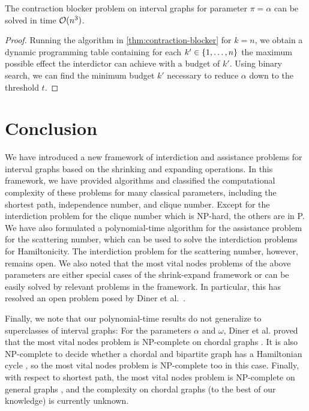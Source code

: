 \begin{corollary}
The contraction blocker problem on interval graphs for parameter $\pi = \alpha$ can be solved in time $\mathcal{O}(n^3)$.
\end{corollary}
\begin{proof}
Running the algorithm in \cref{thm:contraction-blocker} for $k = n$, we obtain a dynamic programming table containing for each $k' \in \{ 1, \ldots, n \}$ the maximum possible effect the interdictor can achieve with a budget of $k'$. Using binary search, we can find the minimum budget $k'$ necessary to reduce $\alpha$ down to the threshold $t$.
\end{proof}

\section{Conclusion}
We have introduced a new framework of interdiction and assistance problems for interval graphs based on the shrinking and expanding operations.
In this framework, we have provided algorithms and classified the computational complexity of these problems for many classical parameters, including the shortest path, independence number, and clique number.
Except for the interdiction problem for the clique number which is NP-hard, the others are in P.
We have also formulated a polynomial-time algorithm for the assistance problem for the scattering number, which can be used to solve the interdiction problems for Hamiltonicity.
The interdiction problem for the scattering number, however, remains open.
We also noted that the most vital nodes problems of the above parameters are either special cases of the shrink-expand framework or can be easily solved by relevant problems in the framework. 
In particular, this has resolved an open problem posed by Diner et al.~\cite[(Q2)]{diner2018contractionDeletionBlockers}.

Finally, we note that our polynomial-time results do not generalize to superclasses of interval graphs: For the parameters $\alpha$ and $\omega$, Diner et al. proved that the most vital nodes problem is NP-complete on chordal graphs \cite{diner2018contractionDeletionBlockers}. It is also NP-complete to decide whether a chordal and bipartite graph has a Hamiltonian cycle \cite{muller1996hamiltonian}, so the most vital nodes problem is NP-complete too in this case. Finally, with respect to shortest path, the most vital nodes problem is NP-complete on general graphs \cite{complexityOfFindingMostVitalNodesShortestPath}, and the complexity on chordal graphs (to the best of our knowledge) is currently unknown.
